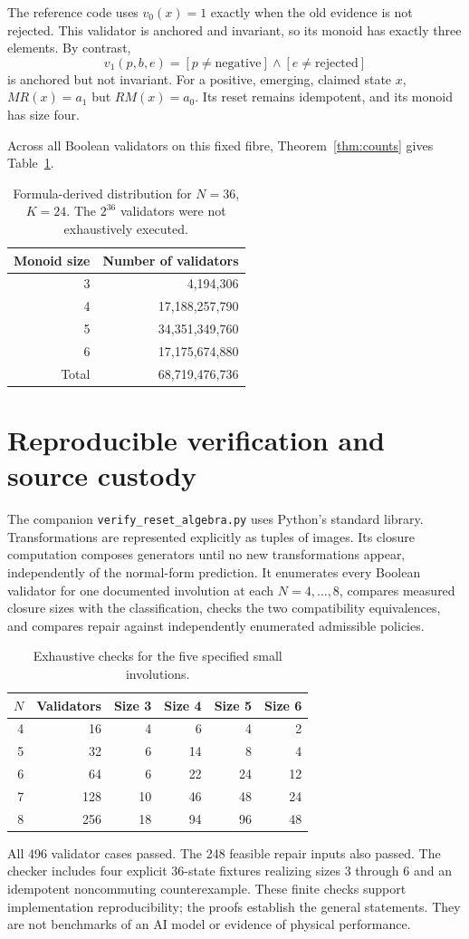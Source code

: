 \documentclass[11pt,a4paper]{article}
\begin{document}
The reference code uses $v_0(x)=1$ exactly when the old evidence is not rejected. This validator is anchored and invariant, so its monoid has exactly three elements. By contrast,
\[
 v_1(p,b,e)=[p\ne\text{negative}]\wedge[e\ne\text{rejected}]
\]
is anchored but not invariant. For a positive, emerging, claimed state $x$, $MR(x)=a_1$ but $RM(x)=a_0$. Its reset remains idempotent, and its monoid has size four.

Across all Boolean validators on this fixed fibre, Theorem~\ref{thm:counts} gives Table~\ref{tab:large}.
\begin{table}[ht]
\centering
\begin{tabular}{rr}
\toprule
Monoid size & Number of validators\\
\midrule
3 & 4,194,306\\
4 & 17,188,257,790\\
5 & 34,351,349,760\\
6 & 17,175,674,880\\
\midrule
Total & 68,719,476,736\\
\bottomrule
\end{tabular}
\caption{Formula-derived distribution for $N=36$, $K=24$. The $2^{36}$ validators were not exhaustively executed.}\label{tab:large}
\end{table}

\section{Reproducible verification and source custody}
The companion \texttt{verify\_reset\_algebra.py} uses Python's standard library. Transformations are represented explicitly as tuples of images. Its closure computation composes generators until no new transformations appear, independently of the normal-form prediction. It enumerates every Boolean validator for one documented involution at each $N=4,\ldots,8$, compares measured closure sizes with the classification, checks the two compatibility equivalences, and compares repair against independently enumerated admissible policies.
\begin{table}[ht]
\centering
\begin{tabular}{rrrrrr}
\toprule
$N$ & Validators & Size 3 & Size 4 & Size 5 & Size 6\\
\midrule
4 & 16 & 4 & 6 & 4 & 2\\
5 & 32 & 6 & 14 & 8 & 4\\
6 & 64 & 6 & 22 & 24 & 12\\
7 & 128 & 10 & 46 & 48 & 24\\
8 & 256 & 18 & 94 & 96 & 48\\
\bottomrule
\end{tabular}
\caption{Exhaustive checks for the five specified small involutions.}\label{tab:checks}
\end{table}
All 496 validator cases passed. The 248 feasible repair inputs also passed. The checker includes four explicit 36-state fixtures realizing sizes 3 through 6 and an idempotent noncommuting counterexample. These finite checks support implementation reproducibility; the proofs establish the general statements. They are not benchmarks of an AI model or evidence of physical performance.
\end{document}
